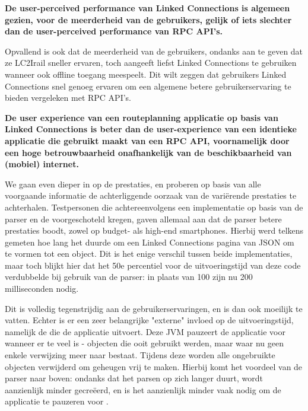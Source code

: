 \textbf{De user-perceived performance van Linked Connections is algemeen gezien, voor de meerderheid van de gebruikers, gelijk of iets slechter dan de user-perceived performance van RPC API's.}

Opvallend is ook dat de meerderheid van de gebruikers, ondanks aan te geven dat ze LC2Irail sneller ervaren, toch aangeeft liefst Linked Connections te gebruiken wanneer ook offline toegang meespeelt. Dit wilt zeggen dat gebruikers Linked Connections snel genoeg ervaren om een algemene betere gebruikerservaring te bieden vergeleken met RPC API's.

\textbf{De user experience van een routeplanning applicatie op basis van Linked Connections is beter dan de user-experience van een identieke applicatie die gebruikt maakt van een RPC API, voornamelijk door een hoge betrouwbaarheid onafhankelijk van de beschikbaarheid van (mobiel) internet.}

We gaan even dieper in op de prestaties, en proberen op basis van alle voorgaande informatie de achterliggende oorzaak van de variërende prestaties te achterhalen. Testpersonen die achtereenvolgens een implementatie op basis van de  parser en de  voorgeschoteld kregen, gaven allemaal aan dat de  parser betere prestaties boodt, zowel op budget- als high-end smartphones. Hierbij werd telkens gemeten hoe lang het duurde om een Linked Connections pagina van JSON om te vormen tot een object. Dit is het enige verschil tussen beide implementaties, maar toch blijkt hier dat het 50e percentiel voor de uitvoeringstijd van deze code verdubbelde bij gebruik van de  parser: in plaats van 100 zijn nu 200 milliseconden nodig.

Dit is volledig tegenstrijdig aan de gebruikerservaringen, en is dan ook moeilijk te vatten. Echter is er een zeer belangrijke "externe" invloed op de uitvoeringstijd, namelijk de  die de applicatie uitvoert. Deze JVM pauzeert de applicatie voor  wanneer er te veel  is - objecten die ooit gebruikt werden, maar waar nu geen enkele verwijzing meer naar bestaat. Tijdens deze  worden alle ongebruikte objecten verwijderd om geheugen vrij te maken. Hierbij komt het voordeel van de  parser naar boven: ondanks dat het parsen op zich langer duurt, wordt aanzienlijk minder  gecreëerd, en is het aanzienlijk minder vaak nodig om de applicatie te pauzeren voor .

